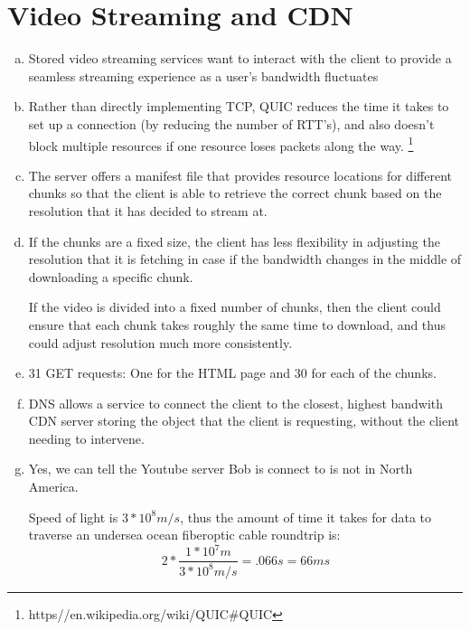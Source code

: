 \documentclass[11pt]{article}
\begin{document}
\section*{Video Streaming and CDN}
  \begin{enumerate}[(a)]
    \item
      Stored video streaming services want to interact with the client to provide
      a seamless streaming experience as a user's bandwidth fluctuates
    \item
      Rather than directly implementing TCP, QUIC reduces the time it takes
      to set up a connection (by reducing the number of RTT's), and also doesn't
      block multiple resources if one resource loses packets along the way.
      \footnote{https\://en.wikipedia.org/wiki/QUIC\#QUIC}
    \item
      The server offers a manifest file that provides resource locations for
      different chunks so that the client is able to retrieve the correct chunk
      based on the resolution that it has decided to stream at.
    \item
      If the chunks are a fixed size, the client has less flexibility in
      adjusting the resolution that it is fetching in case if the bandwidth changes
      in the middle of downloading a specific chunk.

      If the video is divided into a fixed number of chunks, then the client could ensure that each chunk takes roughly the same time to download, and thus could
      adjust resolution much more consistently.
    \item
      31 GET requests: One for the HTML page and 30 for each of the chunks.
    \item
      DNS allows a service to connect the client to the closest, highest bandwith
      CDN server storing the object that the client is requesting, without the client
      needing to intervene.
    \item
      Yes, we can tell the Youtube server Bob is connect to is not in North America.

      Speed of light is $3 * 10^8 m/s$, thus the amount of time it takes for data
      to traverse an undersea ocean fiberoptic cable roundtrip is:
      \[ 2 * \frac{1 * 10^7 m}{3 * 10^8 m/s} = .066 s = 66 ms \]


\end{enumerate}
\end{document}
